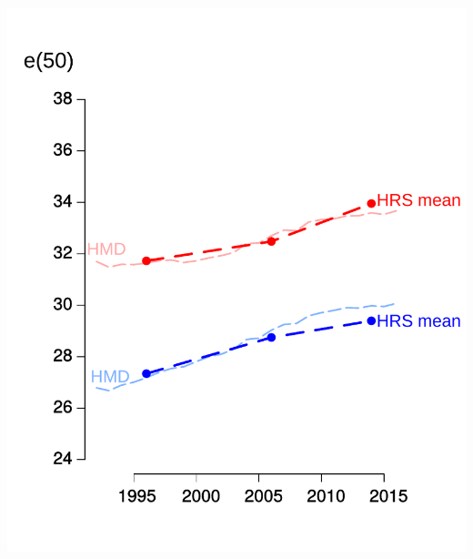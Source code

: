 \documentclass[20pt,usenames,dvipsnames]{beamer}
\begin{document}
\begin{frame}[plain]
\vspace{-1em}
\begin{center}
\includegraphics[height=20cm, keepaspectratio]{Figures/e50_1.pdf}
\end{center}
\end{frame}
\end{document}
